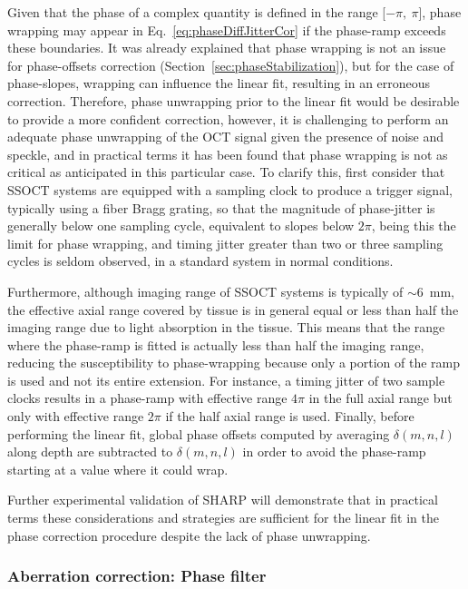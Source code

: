 Given that the phase of a complex quantity is defined in the range [$-\pi,\ \pi$], phase wrapping may appear in Eq.~\ref{eq:phaseDiffJitterCor} if the phase-ramp exceeds these boundaries. It was already explained that phase wrapping is not an issue for phase-offsets correction (Section~\ref{sec:phaseStabilization}), but for the case of phase-slopes, wrapping can influence the linear fit, resulting in an erroneous correction. Therefore, phase unwrapping prior to the linear fit would be desirable to provide a more confident correction, however, it is challenging to perform an adequate phase unwrapping of the OCT signal given the presence of noise and speckle, and in practical terms it has been found that phase wrapping is not as critical as anticipated in this particular case. To clarify this, first consider that SSOCT systems are equipped with a sampling clock to produce a trigger signal, typically using a fiber Bragg grating, so that the magnitude of phase-jitter is generally below one sampling cycle, equivalent to slopes below $2\pi$, being this the limit for phase wrapping, and timing jitter greater than two or three sampling cycles is seldom observed, in a standard system in normal conditions.

Furthermore, although imaging range of SSOCT systems is typically of $\sim$6~mm, the effective axial range covered by tissue is in general equal or less than half the imaging range due to light absorption in the tissue. This means that the range where the phase-ramp is fitted is actually less than half the imaging range, reducing the susceptibility to phase-wrapping because only a portion of the ramp is used and not its entire extension. For instance, a timing jitter of two sample clocks results in a phase-ramp with effective range $4\pi$ in the full axial range but only with effective range $2\pi$ if the half axial range is used. Finally, before performing the linear fit, global phase offsets computed by averaging $\delta(m,n,l)$ along depth are subtracted to $\delta(m,n,l)$ in order to avoid the phase-ramp starting at a value where it could wrap.

Further experimental validation of SHARP will demonstrate that in practical terms these considerations and strategies are sufficient for the linear fit in the phase correction procedure despite the lack of phase unwrapping.

\subsubsection{Aberration correction: Phase filter}

